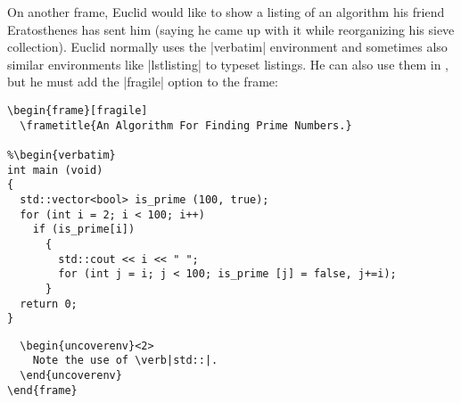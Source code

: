 On another frame, Euclid would like to show a listing of an algorithm his friend Eratosthenes has sent him (saying he came up with it while reorganizing his sieve collection). Euclid normally uses the |verbatim| environment and sometimes also similar environments like |lstlisting| to typeset listings. He can also use them in \beamer, but he must add the |fragile| option to the frame:
\begin{verbatim}
\begin{frame}[fragile]
  \frametitle{An Algorithm For Finding Prime Numbers.}

%\begin{verbatim}
int main (void)
{
  std::vector<bool> is_prime (100, true);
  for (int i = 2; i < 100; i++)
    if (is_prime[i])
      {
        std::cout << i << " ";
        for (int j = i; j < 100; is_prime [j] = false, j+=i);
      }
  return 0;
}
\end{verbatim}
\unskip{\MacroFont|\end{verbatim}|}
\begin{verbatim}
  \begin{uncoverenv}<2>
    Note the use of \verb|std::|.
  \end{uncoverenv}
\end{frame}
\end{verbatim}

